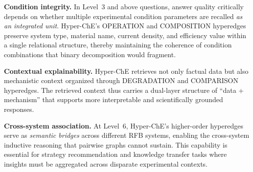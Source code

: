 \textbf{Condition integrity.} In Level~3 and above questions, answer quality critically depends on whether multiple experimental condition parameters are recalled \emph{as an integrated unit}. Hyper-ChE's OPERATION and COMPOSITION hyperedges preserve system type, material name, current density, and efficiency value within a single relational structure, thereby maintaining the coherence of condition combinations that binary decomposition would fragment.

\textbf{Contextual explainability.} Hyper-ChE retrieves not only factual data but also mechanistic context organized through DEGRADATION and COMPARISON hyperedges. The retrieved context thus carries a dual-layer structure of ``data + mechanism'' that supports more interpretable and scientifically grounded responses.

\textbf{Cross-system association.} At Level~6, Hyper-ChE's higher-order hyperedges serve as \emph{semantic bridges} across different RFB systems, enabling the cross-system inductive reasoning that pairwise graphs cannot sustain. This capability is essential for strategy recommendation and knowledge transfer tasks where insights must be aggregated across disparate experimental contexts.
